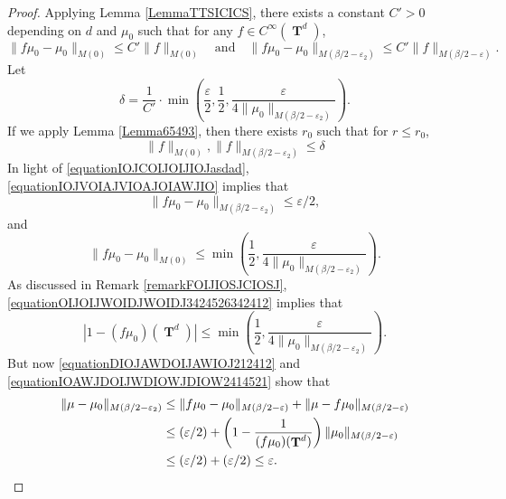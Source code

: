 \documentclass[dvipsnames,letterpaper,12pt]{article}
\numberwithin{equation}{section}
\DeclareMathOperator{\TT}{\mathbf{T}}
\numberwithin{theorem}{section}
\begin{document}
\begin{proof}
    Applying Lemma \ref{LemmaTTSICICS}, there exists a constant $C' > 0$ depending on $d$ and $\mu_0$ such that for any $f \in C^\infty(\TT^d)$,
    \begin{equation} \label{equationIOJCOIJOIJIOJasdad}
        \| f\mu_0 - \mu_0 \|_{M(0)} \leq C' \| f \|_{M(0)} \quad\text{and}\quad \| f\mu_0 - \mu_0 \|_{M(\beta/2-\varepsilon_2)} \leq C' \| f \|_{M(\beta/2-\varepsilon)}.
    \end{equation}
    Let
    \[ \delta = \frac{1}{C'} \cdot \min \left( \frac{\varepsilon}{2}, \frac{1}{2}, \frac{\varepsilon}{4 \| \mu_0 \|_{M(\beta/2-\varepsilon_2)}} \right). \]
    If we apply Lemma \ref{Lemma65493}, then there exists $r_0$ such that for $r \leq r_0$,
    \begin{equation} \label{equationIOJVOIAJVIOAJOIAWJIO}
        \| f \|_{M(0)}, \| f \|_{M(\beta/2 - \varepsilon_2)} \leq \delta
    \end{equation}
    In light of \eqref{equationIOJCOIJOIJIOJasdad}, \eqref{equationIOJVOIAJVIOAJOIAWJIO} implies that
    \begin{equation} \label{equationDIOJAWDOIJAWIOJ212412}
        \| f \mu_0 - \mu_0 \|_{M(\beta/2 - \varepsilon_2)} \leq \varepsilon/2,
    \end{equation}
    and
    \begin{equation} \label{equationOIJOIJWOIDJWOIDJ3424526342412}
        \| f \mu_0 - \mu_0 \|_{M(0)} \leq \min \left( \frac{1}{2}, \frac{\varepsilon}{4 \| \mu_0 \|_{M(\beta/2 - \varepsilon_2)}} \right).
    \end{equation}
    As discussed in Remark \ref{remarkFOIJIOSJCIOSJ}, \eqref{equationOIJOIJWOIDJWOIDJ3424526342412} implies that
    \begin{equation} \label{equationIOAWJDOIJWDIOWJDIOW2414521}
        \left| 1 - (f\mu_0)(\TT^d) \right| \leq \min \left( \frac{1}{2}, \frac{\varepsilon}{4 \| \mu_0 \|_{M(\beta/2 - \varepsilon_2)}} \right).
    \end{equation}
    But now \eqref{equationDIOJAWDOIJAWIOJ212412} and \eqref{equationIOAWJDOIJWDIOWJDIOW2414521} show that
    \begin{equation}
    \begin{split}
        \| \mu - \mu_0 \|_{M(\beta/2 - \varepsilon_2)} &\leq \| f \mu_0 - \mu_0 \|_{M(\beta/2 - \varepsilon)} + \| \mu - f \mu_0 \|_{M(\beta/2 - \varepsilon)}\\
        &\leq (\varepsilon/2) + \left( 1 - \frac{1}{(f \mu_0)(\TT^d)} \right) \| \mu_0 \|_{M(\beta/2 - \varepsilon)}\\
        &\leq (\varepsilon/2) + (\varepsilon/2) \leq \varepsilon. \qedhere
    \end{split}
    \end{equation}
\end{proof}
\end{document}
